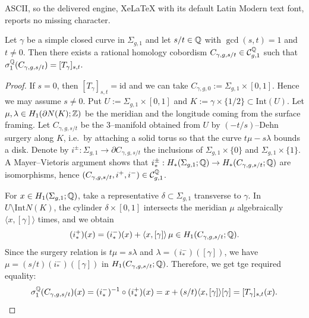 \documentclass[10pt,a4paper]{amsart}
\newcommand{\Q}{{\Bbb Q}}
\newcommand{\Z}{{\Bbb Z}}
\begin{document}
ASCII, so the delivered engine, XeLaTeX with its default Latin Modern text font, reports no missing character.
\begin{lem}\label{lem:transvection_cobordism}
Let $\gamma$ be a simple closed curve in $\Sigma_{g,1}$ and let $s/t\in\Q$ with $\gcd(s,t)=1$ and $t\neq 0$.
Then there exists a rational homology cobordism $C_{\gamma,g,s/t}\in\mathcal{C}_{g,1}^{\Q}$ such that
$
\sigma_1^{\Q}(C_{\gamma,g,s/t})=[T_{\gamma}]_{s,t}.
$
\end{lem}

\begin{proof}
If $s=0$, then $[T_{\gamma}]_{s,t}=\mathrm{id}$ and we can take $C_{\gamma,g,0}:=\Sigma_{g,1}\times[0,1]$.
Hence we may assume $s\neq 0$.
Put $U:=\Sigma_{g,1}\times[0,1]$ and $K:=\gamma\times\{1/2\}\subset \mathrm{Int}(U)$.
Let $\mu,\lambda\in H_1(\partial N(K);\Z)$ be the meridian and the longitude coming from the surface framing.
Let $C_{\gamma,g,s/t}$ be the $3$--manifold obtained from $U$ by $(-t/s)$--Dehn surgery along $K$,
i.e.\ by attaching a solid torus so that the curve $t\mu-s\lambda$ bounds a disk.
Denote by $i^\pm:\Sigma_{g,1}\to \partial C_{\gamma,g,s/t}$ the inclusions of $\Sigma_{g,1}\times\{0\}$ and $\Sigma_{g,1}\times\{1\}$.
A Mayer--Vietoris argument shows that $i^\pm_*:H_*(\Sigma_{g,1};\Q)\to H_*(C_{\gamma,g,s/t};\Q)$ are isomorphisms, hence
$(C_{\gamma,g,s/t},i^+,i^-)\in \mathcal{C}_{g,1}^{\Q}$.

For $x\in H_1(\Sigma_{g,1};\Q)$, take a representative $\delta\subset \Sigma_{g,1}$ transverse to $\gamma$.
In $U\setminus \mathrm{Int}N(K)$, the cylinder $\delta\times[0,1]$ intersects the meridian $\mu$ algebraically $\langle x,[\gamma]\rangle$ times, and we obtain
\[
(i^+_*)(x)=(i^-_*)(x)+\langle x,[\gamma]\rangle\,\mu\in H_1(C_{\gamma,g,s/t};\Q).
\]
Since the surgery relation is $t\mu=s\lambda$ and $\lambda=(i^-_*)([\gamma])$, we have $\mu=(s/t)(i^-_*)([\gamma])$ in $H_1(C_{\gamma,g,s/t};\Q)$.
Therefore, we get tge required equality:
\[
\sigma_1^{\Q}(C_{\gamma,g,s/t})(x)=(i^-_*)^{-1}\circ(i^+_*)(x)
=x+(s/t)\langle x,[\gamma]\rangle[\gamma]=[T_{\gamma}]_{s,t}(x).
\]

\end{proof}
\end{document}
